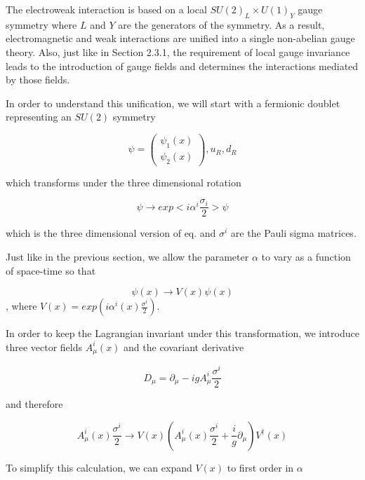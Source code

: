The electroweak interaction is based on a local $SU(2)_{L}\times U(1)_{Y}$ gauge symmetry where $L$ and $Y$ are the generators of the symmetry. As a result, electromagnetic and weak interactions are unified into a single non-abelian gauge theory. Also, just like in Section 2.3.1, the requirement of local gauge invariance leads to the introduction of gauge fields and determines the interactions mediated by those fields.

In order to understand this unification, we will start with a fermionic doublet representing an $SU(2)$ symmetry

\begin{equation}
\psi = \begin{pmatrix}
	\psi_{1}(x) \\
	\psi_{2}(x)
\end{pmatrix}, u_{R}, d_{R}
\end{equation}

which transforms under the three dimensional rotation

\begin{equation}
\psi\rightarrow exp<i\alpha^{i}\frac{\sigma_{i}}{2}>\psi
\end{equation}

which is the three dimensional version of eq. and $\sigma^{i}$ are the Pauli sigma matrices.

Just like in the previous section, we allow the parameter $\alpha$ to vary as a function of space-time so that

\begin{equation}
\psi(x)\rightarrow V(x)\psi(x)
\end{equation}
, where $V(x)= exp(i\alpha^{i}(x)\frac{\sigma^{i}}{2})$.

In order to keep the Lagrangian invariant under this transformation, we introduce three vector fields $A_{\mu}^{i}(x)$ and the covariant derivative

\begin{equation}
D_{\mu} = \partial_{\mu} - igA_{\mu}^{i}\frac{\sigma^{i}}{2}
\end{equation}

and therefore

\begin{equation}
A_{\mu}^{i}(x)\frac{\sigma^{i}}{2}\rightarrow V(x)(A_{\mu}^{i}(x)\frac{\sigma^{i}}{2}+\frac{i}{g}\partial_{\mu})V^{\dagger}(x)
\end{equation}

To simplify this calculation, we can expand $V(x)$ to first order in $\alpha$ 

